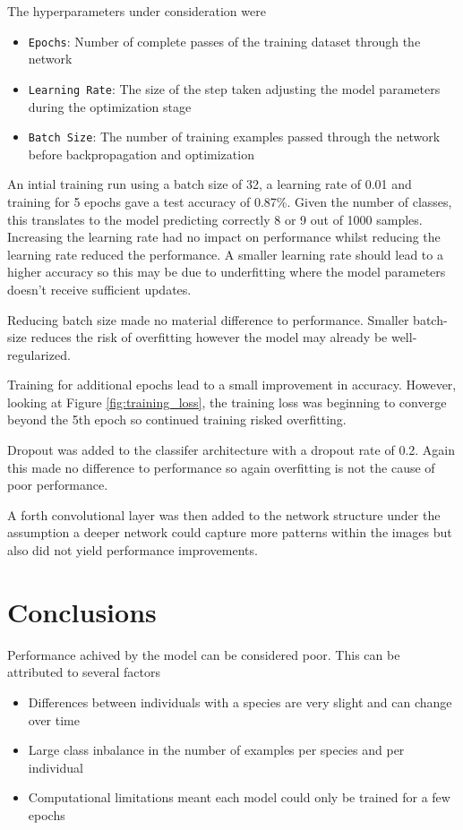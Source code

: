 \documentclass{article}
\begin{document}
The hyperparameters under consideration were

\begin{itemize}
    \item \verb|Epochs|: Number of complete passes of the training dataset through the network
    \item \verb|Learning Rate|: The size of the step taken adjusting the model parameters during the optimization stage
    \item \verb|Batch Size|: The number of training examples passed through the network before backpropagation and optimization
\end{itemize}

An intial training run using a batch size of 32, a learning rate of 0.01 and training for 5 epochs gave a test accuracy of 0.87\%. Given the number of classes, this translates to the model predicting correctly 8 or 9 out of 1000 samples.
Increasing the learning rate had no impact on performance whilst reducing the learning rate reduced the performance. A smaller learning rate should lead to a higher accuracy \cite{smith2018dont} so this may be due to underfitting where the model parameters doesn't receive sufficient updates.


Reducing batch size made no material difference to performance. Smaller batch-size reduces the risk of overfitting however the model may already be well-regularized.

Training for additional epochs lead to a small improvement in accuracy. However, looking at Figure \ref{fig:training_loss}, the training loss was beginning to converge beyond the 5th epoch so continued training risked overfitting.

Dropout was added to the classifer architecture with a dropout rate of 0.2. Again this made no difference to performance so again overfitting is not the cause of poor performance.

A forth convolutional layer was then added to the network structure under the assumption a deeper network could capture more patterns within the images but also did not yield performance improvements. 

\section{Conclusions}

Performance achived by the model can be considered poor. This can be attributed to several factors

\begin{itemize}
    \item Differences between individuals with a species are very slight and can change over time
    \item Large class inbalance in the number of examples per species and per individual
    \item Computational limitations meant each model could only be trained for a few epochs
\end{itemize}
\end{document}
